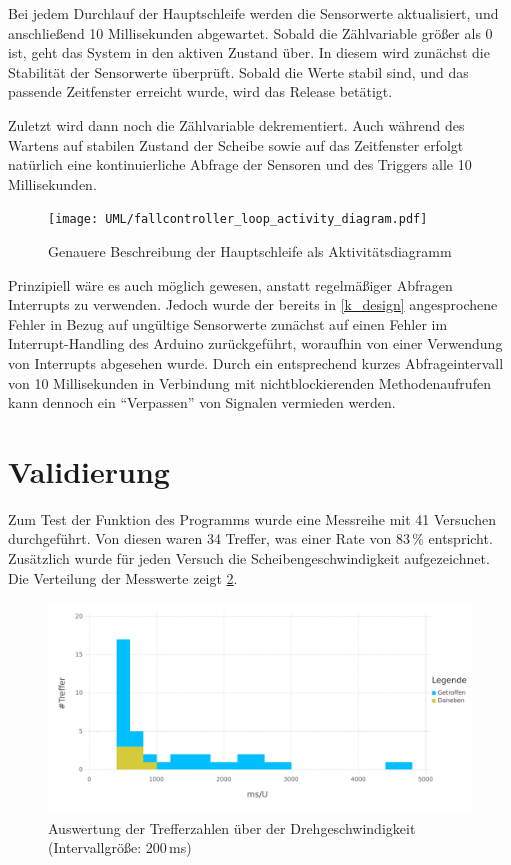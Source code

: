 Bei jedem Durchlauf der Hauptschleife werden die Sensorwerte aktualisiert, und anschließend 10 Millisekunden abgewartet.
Sobald die Zählvariable größer als 0 ist, geht das System in den aktiven Zustand über.
In diesem wird zunächst die Stabilität der Sensorwerte überprüft.
Sobald die Werte stabil sind, und das passende Zeitfenster erreicht wurde, wird das Release betätigt.

Zuletzt wird dann noch die Zählvariable dekrementiert.
Auch während des Wartens auf stabilen Zustand der Scheibe sowie auf das Zeitfenster erfolgt natürlich eine kontinuierliche Abfrage der Sensoren und des Triggers alle 10 Millisekunden.

\begin{figure}[htb!] \centering
	\texttt{[image: UML/fallcontroller\_loop\_activity\_diagram.pdf]}
	\caption{Genauere Beschreibung der Hauptschleife als Aktivitätsdiagramm}
	\label{uml:activity_diagram}
\end{figure}

Prinzipiell wäre es auch möglich gewesen, anstatt regelmäßiger Abfragen Interrupts zu verwenden.
Jedoch wurde der bereits in \cref{k_design} angesprochene Fehler in Bezug auf ungültige Sensorwerte zunächst auf einen Fehler im Interrupt-Handling des Arduino zurückgeführt, woraufhin von einer Verwendung von Interrupts abgesehen wurde.
Durch ein entsprechend kurzes Abfrageintervall von 10 Millisekunden in Verbindung mit nichtblockierenden Methodenaufrufen kann dennoch ein \enquote{Verpassen} von Signalen vermieden werden.

\section{Validierung}
Zum Test der Funktion des Programms wurde eine Messreihe mit 41 Versuchen durchgeführt.
Von diesen waren 34 Treffer, was einer Rate von 83\,\% entspricht.
Zusätzlich wurde für jeden Versuch die Scheibengeschwindigkeit aufgezeichnet.
Die Verteilung der Messwerte zeigt \cref{img:auswertungsplot}.

\begin{figure}[htb!] \centering
	\includegraphics[width=\textwidth]{images/auswertung.pdf}
	\caption{Auswertung der Trefferzahlen über der Drehgeschwindigkeit (Intervallgröße: 200\,ms)}
	\label{img:auswertungsplot}
\end{figure}

